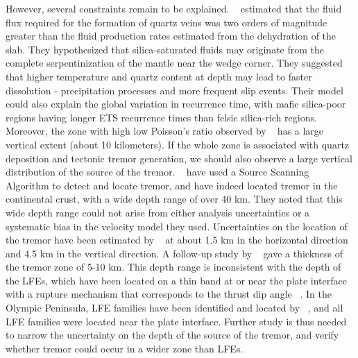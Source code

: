 \documentclass[draft]{agujournal2019}
\begin{document}
However, several constraints remain to be explained. ~ estimated that the fluid flux required for the formation of quartz veins was two orders of magnitude greater than the fluid production rates estimated from the dehydration of the slab. They hypothesized that silica-saturated fluids may originate from the complete serpentinization of the mantle near the wedge corner. They suggested that higher temperature and quartz content at depth may lead to faster dissolution - precipitation processes and more frequent slip events. Their model could also explain the global variation in recurrence time, with mafic silica-poor regions having longer ETS recurrence times than felsic silica-rich regions. \\

Moreover, the zone with high low Poisson's ratio observed by ~ has a large vertical extent (about 10 kilometers). If the whole zone is associated with quartz deposition and tectonic tremor generation, we should also observe a large vertical distribution of the source of the tremor. ~ have used a Source Scanning Algorithm to detect and locate tremor, and have indeed located tremor in the continental crust, with a wide depth range of over 40 km. They noted that this wide depth range could not arise from either analysis uncertainties or a systematic bias in the velocity model they used. Uncertainties on the location of the tremor have been estimated by ~ at about 1.5 km in the horizontal direction and 4.5 km in the vertical direction. A follow-up study by ~ gave a thickness of the tremor zone of 5-10 km. This depth range is inconsistent with the depth of the LFEs, which have been located on a thin band at or near the plate interface with a rupture mechanism that corresponds to the thrust dip angle ~\cite{IDE_2007_GRL}. In the Olympic Peninsula, LFE families have been identified and located by ~, and all LFE families were located near the plate interface. Further study is thus needed to narrow the uncertainty on the depth of the source of the tremor, and verify whether tremor could occur in a wider zone than LFEs. \\
\end{document}
